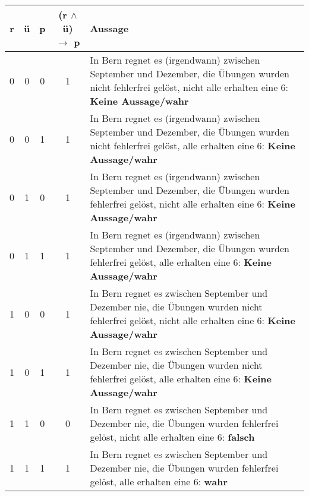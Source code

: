 \documentclass[12pt,a4paper]{article}
\begin{document}
\begin{enumerate}[a)]
\begin{tabular}{c|c|c|c|p{}}
r & ü & p & (r $\land$ ü) $\rightarrow$ p & Aussage\\
\hline
0 & 0 & 0 & 1 & In Bern regnet es (irgendwann) zwischen September und Dezember, die Übungen wurden nicht fehlerfrei gelöst, nicht alle erhalten eine 6: \textbf{Keine Aussage/wahr}\\
\hline
0 & 0 & 1 & 1 & In Bern regnet es (irgendwann) zwischen September und Dezember, die Übungen wurden nicht fehlerfrei gelöst, alle erhalten eine 6: \textbf{Keine Aussage/wahr}\\
\hline
0 & 1 & 0 & 1 & In Bern regnet es (irgendwann) zwischen September und Dezember, die Übungen wurden fehlerfrei gelöst, nicht alle erhalten eine 6: \textbf{Keine Aussage/wahr}\\
\hline
0 & 1 & 1 & 1 & In Bern regnet es (irgendwann) zwischen September und Dezember, die Übungen wurden fehlerfrei gelöst, alle erhalten eine 6: \textbf{Keine Aussage/wahr}\\
\hline
1 & 0 & 0 & 1 & In Bern regnet es zwischen September und Dezember nie, die Übungen wurden nicht fehlerfrei gelöst, nicht alle erhalten eine 6: \textbf{Keine Aussage/wahr}\\
\hline
1 & 0 & 1 & 1 &  In Bern regnet es zwischen September und Dezember nie, die Übungen wurden nicht fehlerfrei gelöst, alle erhalten eine 6: \textbf{Keine Aussage/wahr}\\
\hline
1 & 1 & 0 & 0 &  In Bern regnet es zwischen September und Dezember nie, die Übungen wurden fehlerfrei gelöst, nicht alle erhalten eine 6: \textbf{falsch}\\
\hline
1 & 1 & 1 & 1 &  In Bern regnet es zwischen September und Dezember nie, die Übungen wurden fehlerfrei gelöst, alle erhalten eine 6: \textbf{wahr}\\
\end{tabular}
\end{enumerate}
\end{document}
